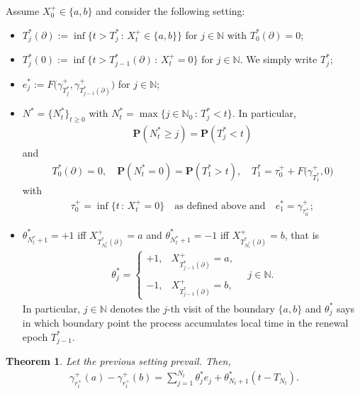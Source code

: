 \documentclass[10pt,a4paper]{article}
\numberwithin{equation}{section}
\theoremstyle{plain}
\newtheorem{theorem}{Theorem}
\theoremstyle{remark}
\begin{document}
Assume $X^+_0 \in \{a, b\}$ and consider the following setting:
\begin{itemize}
\item[i)] $T^*_j(\partial) := \inf \{t > T^*_j\,:\, X^+_t \in \{a,b\}\}$ for $j \in \mathbb{N}$ with $T^*_0(\partial)=0$;
\item[ii)] $T^*_j(0) := \inf\{t> T^*_{j-1}(\partial)\,:\, X^+_t =0\}$ for $j \in \mathbb{N}$. We simply write $T^*_j$; 
\item[iii)] $e^*_j := F\big(\gamma^+_{T^*_j}, \gamma^+_{T^*_{j-1}(\partial)}\big)$ for $j \in \mathbb{N}$;
\item[iv)] $N^*=\{N^*_t\}_{t \geq 0}$ with $N^*_t = \max\{j \in \mathbb{N}_0 \,:\, T^*_j < t\}$. In particular, 
\begin{align*}
\mathbf{P}(N^*_t \geq j) = \mathbf{P}(T^*_j < t)
\end{align*}
and
\begin{align*}
T^*_0 (\partial)=0, \quad \mathbf{P}(N^*_t=0) = \mathbf{P}(T^*_1 >t), \quad  T^*_1 = \tau^+_0 + F\big(\gamma^+_{T^*_1}, 0\big)
\end{align*}
with
\begin{align*}
\tau^+_0 = \inf\{t\,:\, X^+_t = 0 \} \quad \textrm{as defined above and} \quad e^*_1 = \gamma^+_{\tau^+_0};
\end{align*}
\item[v)] $\theta^*_{N^*_t + 1} = +1$ iff $X^+_{T^*_{N^*_t}(\partial)} = a$ and $\theta^*_{N^*_t + 1} = -1$ iff $X^+_{T^*_{N^*_t}(\partial)} =b$, that is 
\begin{align*}
\theta^*_{j} = \left\lbrace
\begin{array}{ll}
\displaystyle +1, & X^+_{T^*_{j-1}(\partial)} =a,\\
\\
\displaystyle -1, & X^+_{T^*_{j-1}(\partial)} =b,
\end{array}
\right . \quad j \in \mathbb{N}.
\end{align*}
In particular, $j \in \mathbb{N}$ denotes the $j$-th visit of the boundary $\{a, b\}$ and $\theta^*_j$ says in which boundary point the process accumulates local time in the renewal epoch $T^*_{j-1}$.
\end{itemize}

\begin{theorem}
Let the previous setting prevail. Then, 
\begin{align*}
\gamma^+_{r^+_t}(a) - \gamma^+_{r^+_t}(b) = \sum_{j=1}^{N_t} \theta^*_j e_j + \theta^*_{N_t + 1} \left( t - T_{N_t} \right).
\end{align*}
\label{thmDiffLT}
\end{theorem}
\end{document}
